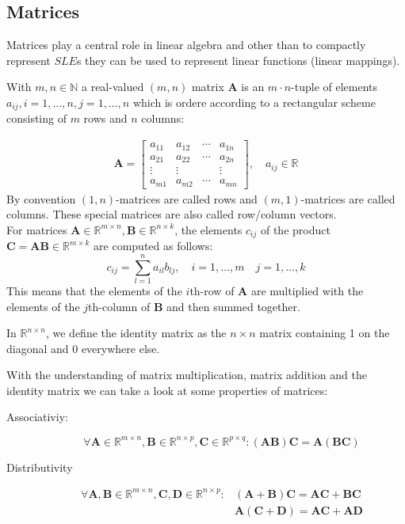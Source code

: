 \subsection{Matrices}
Matrices play a central role in linear algebra and other than to compactly represent $SLE$s they can be used to represent linear functions (linear mappings).

\begin{definition}[Matrix]
    With $m,n \in \mathbb{N}$ a real-valued $(m,n)$ matrix \textbf{A} is an $m\cdot n$-tuple of elements $a_{ij}, i=1,\ldots,n, j=1,\ldots,n$ which is ordere according to a rectangular scheme consisting of $m$ rows and $n$ columns:
\end{definition}
\begin{align}
    \mathbf{A} =
    \begin{bmatrix}
        a_{11} & a_{12} & \cdots & a_{1n}\\
        a_{21} & a_{22} & \cdots & a_{2n}\\
        \vdots & \vdots &  & \vdots\\
        a_{m1} & a_{m2} & \cdots & a_{mn}
    \end{bmatrix}, \quad a_{ij} \in \mathbb{R}
\end{align}
By convention $(1,n)$-matrices are called rows and $(m,1)$-matrices are called columns. These special matrices are also called row/column vectors.\\
For matrices $\mathbf{A} \in \mathbb{R}^{m\times n},\mathbf{B} \in \mathbb{R}^{n\times k}$, the elements $c_{ij}$ of the product $\mathbf{C} = \mathbf{AB} \in \mathbb{R}^{m\times k}$ are computed as follows:
\[
    c_{ij}= \sum_{l=1}^{n}{a_{il}b_{lj}}, \quad i=1,\ldots,m \quad j=1, \ldots, k  
\]
This means that the elements of the $i$th-row of \textbf{A} are multiplied with the elements of the $j$th-column of \textbf{B} and then summed together.
\begin{definition}
    In $\mathbb{R}^{n\times n}$, we define the identity matrix as the $n \times n$ matrix containing 1 on the diagonal and 0 everywhere else. 
\end{definition}
With the understanding of matrix multiplication, matrix addition and the identity matrix we can take a look at some properties of matrices:
\begin{description}
    \item[Associativiy:]\[
        \forall \mathbf{A} \in \mathbb{R}^{m\times n}, \mathbf{B} \in \mathbb{R}^{n\times p}, \mathbf{C} \in \mathbb{R}^{p\times q}: (\mathbf{AB})\mathbf{C} = \mathbf{A}(\mathbf{BC})
    \]
    \item[Distributivity] \begin{align}
        \forall \mathbf{A,B} \in \mathbb{R}^{m\times n}, \mathbf{C,D} \in \mathbb{R}^{n\times p}: &(\mathbf{A}+\mathbf{B})\mathbf{C}= \mathbf{AC}+\mathbf{BC} \\ 
        &\mathbf{A}(\mathbf{C}+\mathbf{D})= \mathbf{AC}+\mathbf{AD}
    \end{align}
\end{description}
